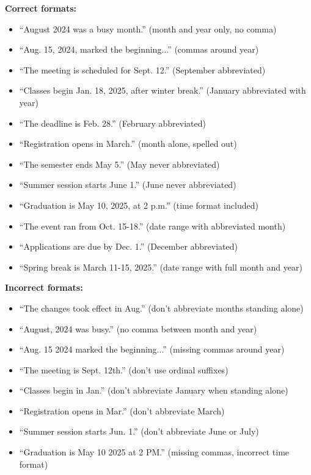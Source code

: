 \documentclass[12pt]{article}
\begin{document}
\begin{afterbox}
\textbf{Correct formats:}
\begin{itemize}
    \item ``August 2024 was a busy month.'' (month and year only, no comma)
    \item ``Aug. 15, 2024, marked the beginning...'' (commas around year)
    \item ``The meeting is scheduled for Sept. 12.'' (September abbreviated)
    \item ``Classes begin Jan. 18, 2025, after winter break.'' (January abbreviated with year)
    \item ``The deadline is Feb. 28.'' (February abbreviated)
    \item ``Registration opens in March.'' (month alone, spelled out)
    \item ``The semester ends May 5.'' (May never abbreviated)
    \item ``Summer session starts June 1.'' (June never abbreviated)
    \item ``Graduation is May 10, 2025, at 2 p.m.'' (time format included)
    \item ``The event ran from Oct. 15-18.'' (date range with abbreviated month)
    \item ``Applications are due by Dec. 1.'' (December abbreviated)
    \item ``Spring break is March 11-15, 2025.'' (date range with full month and year)
\end{itemize}
\end{afterbox}

\begin{beforebox}
\textbf{Incorrect formats:}
\begin{itemize}
    \item ``The changes took effect in Aug.'' (don't abbreviate months standing alone)
    \item ``August, 2024 was busy.'' (no comma between month and year)
    \item ``Aug. 15 2024 marked the beginning...'' (missing commas around year)
    \item ``The meeting is Sept. 12th.'' (don't use ordinal suffixes)
    \item ``Classes begin in Jan.'' (don't abbreviate January when standing alone)
    \item ``Registration opens in Mar.'' (don't abbreviate March)
    \item ``Summer session starts Jun. 1.'' (don't abbreviate June or July)
    \item ``Graduation is May 10 2025 at 2 PM.'' (missing commas, incorrect time format)
\end{itemize}
\end{beforebox}
\end{document}
